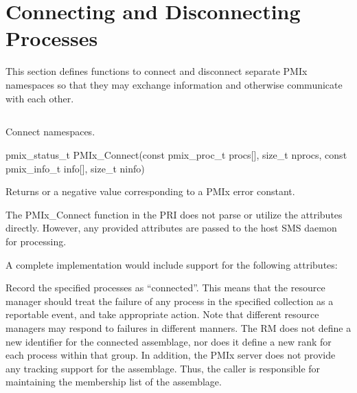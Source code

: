 \section{Connecting and Disconnecting Processes}
\label{chap:api_proc_mgmt:connect}

This section defines functions to connect and disconnect separate \ac{PMIx} namespaces so that they may exchange information and otherwise communicate with each other.

\subsection{}

\summary

Connect namespaces.

\format

\cspecificstart
\begin{codepar}
pmix_status_t
PMIx_Connect(const pmix_proc_t procs[], size_t nprocs,
             const pmix_info_t info[], size_t ninfo)
\end{codepar}
\cspecificend

\begin{arglist}
\end{arglist}

Returns  or a negative value corresponding to a PMIx error constant.

\priattr
The PMIx_Connect function in the \ac{PRI} does not parse or utilize the attributes directly. However, any provided attributes are passed to the host \ac{SMS} daemon for processing.

\optattr
A complete implementation would include support for the following attributes:


\descr

Record the specified processes as ``connected''.
This means that the resource manager should treat the failure of any process in the specified collection as a reportable event, and take appropriate action.
Note that different resource managers may respond to failures in different manners. The RM does not define a new identifier for the connected assemblage, nor does it define a new rank for each process within that group. In addition, the \ac{PMIx} server does not provide any tracking support for the assemblage. Thus, the caller is responsible for maintaining the membership list of the assemblage.

